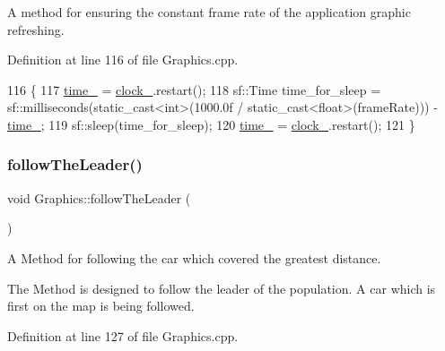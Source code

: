 A method for ensuring the constant frame rate of the application graphic refreshing. 



Definition at line 116 of file Graphics.\+cpp.


\begin{DoxyCode}
116                                                           \{
117     \hyperlink{classGraphics_ab2983b7d90351c0f7b824ac6f887fd6d}{time\_} = \hyperlink{classGraphics_ad9850d50fe5792666c8aea88f39ba99c}{clock\_}.restart();
118     sf::Time time\_for\_sleep = sf::milliseconds(static\_cast<int>(1000.0f / static\_cast<float>(frameRate))) -
       \hyperlink{classGraphics_ab2983b7d90351c0f7b824ac6f887fd6d}{time\_};
119     sf::sleep(time\_for\_sleep);
120     \hyperlink{classGraphics_ab2983b7d90351c0f7b824ac6f887fd6d}{time\_} = \hyperlink{classGraphics_ad9850d50fe5792666c8aea88f39ba99c}{clock\_}.restart();
121 \}
\end{DoxyCode}
\mbox{\label{classGraphics_ad3718f2541f28115865058823113f5cd}} 
\subsubsection{\texorpdfstring{follow\+The\+Leader()}{followTheLeader()}}
{\footnotesize\ttfamily void Graphics\+::follow\+The\+Leader (\begin{DoxyParamCaption}{ }\end{DoxyParamCaption})\hspace{0.3cm}{\ttfamily [private]}}



A Method for following the car which covered the greatest distance. 

The Method is designed to follow the leader of the population. A car which is first on the map is being followed. 

Definition at line 127 of file Graphics.\+cpp.


